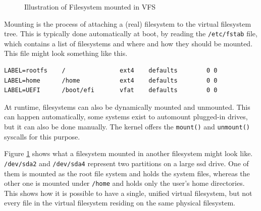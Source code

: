 \documentclass[a4paper]{article}
\begin{document}
\begin{figure}[!h]
\centering
{}
\caption{Illustration of Filesystem mounted in VFS}\label{fig:vfs}
\end{figure}

Mounting is the process of attaching a (real) filesystem to the virtual filesystem tree. This is typically done automatically at boot, by reading the \verb|/etc/fstab| file, which contains a list of filesystems and where and how they should be mounted. This file might look something like this.

\begin{verbatim}
LABEL=rootfs    /               ext4    defaults        0 0
LABEL=home      /home           ext4    defaults        0 0
LABEL=UEFI      /boot/efi       vfat    defaults        0 0
\end{verbatim}
At runtime, filesystems can also be dynamically mounted and unmounted. This can happen automatically, some systems exist to automount plugged-in drives, but it can also be done manually. The kernel offers the \verb|mount()| and \verb|unmount()| syscalls for this purpose.

Figure \ref{fig:vfs} shows what a filesystem mounted in another filesystem might look like. \verb|/dev/sda2| and \verb|/dev/sda4| represent two partitions on a large \gls{ssd} drive. One of them is mounted as the root file system and holds the system files, whereas the other one is mounted under \verb|/home| and holds only the user's home directories. This shows how it is possible to have a single, unified virtual filesystem, but not every file in the virtual filesystem residing on the same physical filesystem.
\end{document}
